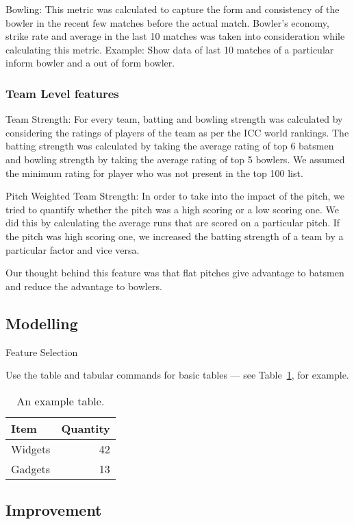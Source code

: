 \documentclass[a4paper]{article}
\begin{document}
Bowling:
This metric was calculated to capture the form and consistency of the bowler in the recent few matches before the actual match. Bowler's economy, strike rate and average in the last 10 matches was taken into consideration while calculating this metric. 
Example:
Show data of last 10 matches of a particular inform bowler and a out of form bowler.




\subsubsection{Team Level features
}

Team Strength:
For every team, batting and bowling strength was calculated by considering the ratings of players of the team as per the ICC world rankings. The batting strength was calculated by taking the average rating of top 6 batsmen and bowling strength by taking the average rating of top 5 bowlers. We assumed the minimum rating  for player who was not present in the top 100 list.

Pitch Weighted Team Strength:
In order to take into the impact of the pitch, we tried to quantify whether the pitch was a high scoring or a low scoring one. We did this by calculating the average runs that are scored on a particular pitch. If the pitch was high scoring one, we increased the batting strength of a team by a particular factor and vice versa.

Our thought behind this feature was that flat pitches give advantage to batsmen and reduce the advantage to bowlers.


\subsection{Modelling}
 
 Feature Selection
 
Use the table and tabular commands for basic tables --- see Table~\ref{tab:widgets}, for example. 

\begin{table}
\centering
\begin{tabular}{l|r}
Item & Quantity \\\hline
Widgets & 42 \\
Gadgets & 13
\end{tabular}
\caption{\label{tab:widgets}An example table.}
\end{table}

\subsection{Improvement }
\end{document}
